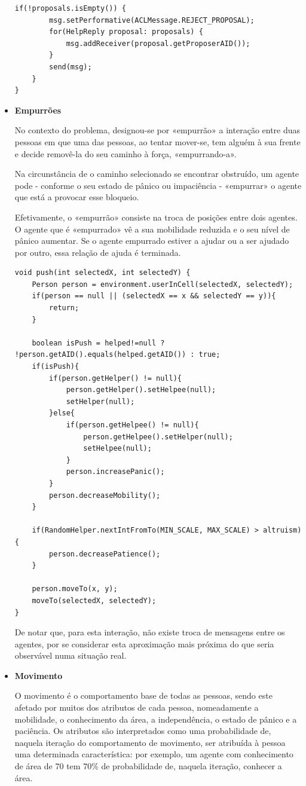 \documentclass[12pt]{article}
\begin{document}
\begin{titlepage}
\begin{itemize}
\begin{lstlisting}[caption= Código \textit{Java}\ das funções responsáveis pela receção e confirmação de prospostas de ajuda.]
	if(!proposals.isEmpty()) {
		msg.setPerformative(ACLMessage.REJECT_PROPOSAL);
		for(HelpReply proposal: proposals) {
			msg.addReceiver(proposal.getProposerAID());
		}
		send(msg);
	}
}
\end{lstlisting}

\item \textbf{Empurrões}

No contexto do problema, designou-se por «empurrão» a interação entre duas pessoas em que uma das pessoas, ao tentar mover-se, tem alguém à sua frente e decide removê-la do seu caminho à força, «empurrando-a».

Na circunstância de o caminho selecionado se encontrar obstruído, um agente pode - conforme o seu estado de pânico ou impaciência - «empurrar» o agente que está a provocar esse bloqueio.

Efetivamente, o «empurrão» consiste na troca de posições entre dois agentes. O agente que é «empurrado» vê a sua mobilidade reduzida e o seu nível de pânico aumentar.
Se o agente empurrado estiver a ajudar ou a ser ajudado por outro, essa relação de ajuda é terminada.

\begin{lstlisting}[caption= Código \textit{Java}\, da função que permite a uma pessoa «empurrar» outra.]
void push(int selectedX, int selectedY) {
	Person person = environment.userInCell(selectedX, selectedY);
	if(person == null || (selectedX == x && selectedY == y)){
		return;
	}
	
	boolean isPush = helped!=null ? !person.getAID().equals(helped.getAID()) : true;	
	if(isPush){
		if(person.getHelper() != null){
			person.getHelper().setHelpee(null);
			setHelper(null);
		}else{
			if(person.getHelpee() != null){
				person.getHelpee().setHelper(null);
				setHelpee(null);
			}	
			person.increasePanic();
		}	
		person.decreaseMobility();
	}			
	
	if(RandomHelper.nextIntFromTo(MIN_SCALE, MAX_SCALE) > altruism) {
		person.decreasePatience();
	}
	
	person.moveTo(x, y);
	moveTo(selectedX, selectedY);
}
\end{lstlisting}

De notar que, para esta interação, não existe troca de mensagens entre os agentes, por se considerar esta aproximação mais próxima do que seria observável numa situação real.

\item \textbf{Movimento}

O movimento é o comportamento base de todas as pessoas, sendo este afetado por muitos dos atributos de cada pessoa, nomeadamente a mobilidade, o conhecimento da área, a independência, o estado de pânico e a paciência. Os atributos são interpretados como uma probabilidade de, naquela iteração do comportamento de movimento, ser atribuída à pessoa uma determinada característica: por exemplo, um agente com conhecimento de área de 70 tem 70\% de probabilidade de, naquela iteração, conhecer a área.


\end{itemize}
\end{titlepage}
\end{document}

